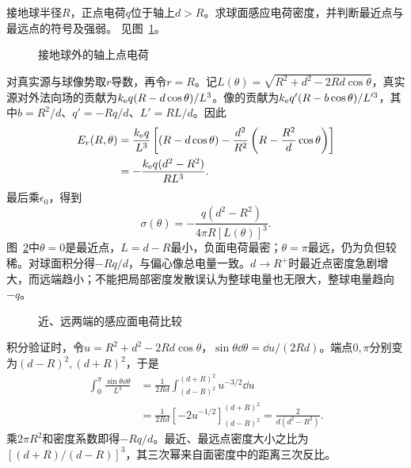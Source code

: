 \begin{exercise}[接地球的面电荷]\label{ex:es3-h2}
接地球半径$R$，正点电荷$q$位于轴上$d>R$。求球面感应电荷密度，并判断最近点与最远点的符号及强弱。 见图~\ref{fig:es3-h2-q}。
\end{exercise}

\begin{figure}[H]\centering
{}
\caption{接地球外的轴上点电荷}\label{fig:es3-h2-q}
\end{figure}
\begin{solution}
对真实源与球像势取$r$导数，再令$r=R$。记$L(\theta)=\sqrt{R^2+d^2-2Rd\cos\theta}$，真实源对外法向场的贡献为$k_{\rm e} q(R-d\cos\theta)/L^3$。像的贡献为$k_{\rm e} q'(R-b\cos\theta)/L'^3$，其中$b=R^2/d$、$q'=-Rq/d$、$L'=RL/d$。因此
\[\begin{split}
E_r(R,\theta)&=\frac{k_{\rm e} q}{L^3}
\left[(R-d\cos\theta)-\frac{d^2}{R^2}
\left(R-\frac{R^2}{d}\cos\theta\right)\right]\\
&=-\frac{k_{\rm e} q(d^2-R^2)}{RL^3}.
\end{split}\]
最后乘$\epsilon_0$，得到
\[\sigma(\theta)=-\frac{q(d^2-R^2)}{4\pi R[L(\theta)]^3}.
\]
图~\ref{fig:es3-h2-s}中$\theta=0$是最近点，$L=d-R$最小，负面电荷最密；$\theta=\pi$最远，仍为负但较稀。对球面积分得$-Rq/d$，与偏心像总电量一致。$d\to R^+$时最近点密度急剧增大，而远端趋小；不能把局部密度发散误认为整球电量也无限大，整球电量趋向$-q$。
\begin{figure}[H]\centering
{}
\caption{近、远两端的感应面电荷比较}\label{fig:es3-h2-s}
\end{figure}


积分验证时，令$u=R^2+d^2-2Rd\cos\theta$，$\sin\theta\dd\theta=\dd u/(2Rd)$。端点$0,\pi$分别变为$(d-R)^2,(d+R)^2$，于是
\[\begin{aligned}
\int_0^\pi\frac{\sin\theta\dd\theta}{L^3}
&=\frac1{2Rd}\int_{(d-R)^2}^{(d+R)^2}u^{-3/2}\dd u\\
&=\frac1{2Rd}[-2u^{-1/2}]_{(d-R)^2}^{(d+R)^2}
=\frac2{d(d^2-R^2)}.
\end{aligned}\]
乘$2\pi R^2$和密度系数即得$-Rq/d$。最近、最远点密度大小之比为$[(d+R)/(d-R)]^3$，其三次幂来自面密度中的距离三次反比。
\end{solution}

